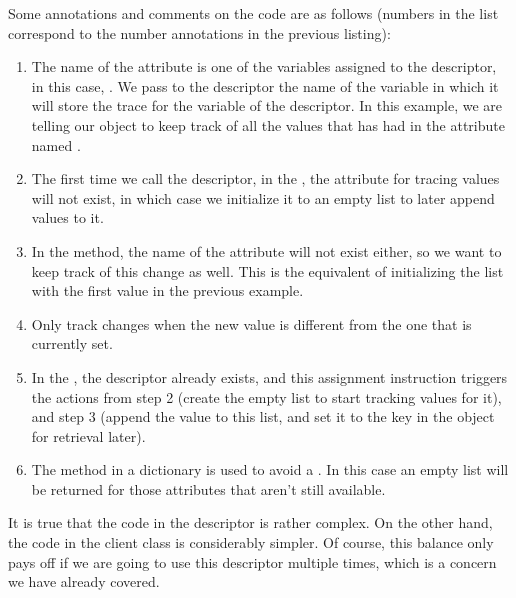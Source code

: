 \documentclass[a4paper,10pt,english]{sphinxmanual}
\begin{document}
Some annotations and comments on the code are as follows (numbers in the list correspond
to the number annotations in the previous listing):
\begin{enumerate}
%
\item {} 
The name of the attribute is one of the variables assigned to the descriptor, in this case, . We pass to the descriptor the name of the variable in which it will store the trace for the variable of the descriptor. In this example, we are telling our object to keep track of all the values that  has had in the attribute named .

\item {} 
The first time we call the descriptor, in the , the attribute for tracing values will not exist, in which case we initialize it to an empty list to later append values to it.

\item {} 
In the  method, the name of the attribute  will not exist either, so we want to keep track of this change as well. This is the equivalent of initializing the list with the first value in the previous example.

\item {} 
Only track changes when the new value is different from the one that is currently set.

\item {} 
In the , the descriptor already exists, and this assignment instruction triggers the actions from step 2 (create the empty list to start tracking values for it), and step 3 (append the value to this list, and set it to the key in the object for retrieval later).

\item {} 
The  method in a dictionary is used to avoid a . In this case an empty list will be returned for those attributes that aren’t still available.

\end{enumerate}

It is true that the code in the descriptor is rather complex. On the other hand, the code in
the client class is considerably simpler. Of course, this balance only pays off if we are
going to use this descriptor multiple times, which is a concern we have already covered.
\end{document}
